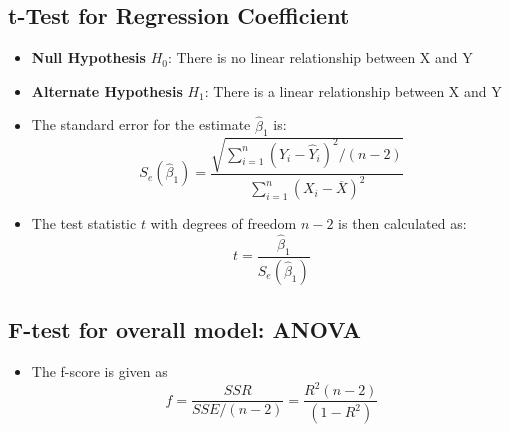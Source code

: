 \documentclass{article}
\theoremstyle{plain}
\theoremstyle{definition}
\begin{document}
\subsection{t-Test for Regression Coefficient}
\begin{itemize}
    \item \textbf{Null Hypothesis} $H_0$: There is no linear relationship between X and Y
    
    \item \textbf{Alternate Hypothesis} $H_1$: There is a linear relationship between X and Y
    
    \item The standard error for the estimate $\hat{\beta}_1$ is:
    \begin{equation*}
        S_e(\hat{\beta}_1) = \frac{\sqrt{\sum\limits_{i=1}^n (Y_i - \hat{Y}_i)^2 / (n-2)}}{\sum\limits_{i=1}^n (X_i - \overline{X})^2}
    \end{equation*}
    
    \item The test statistic $t$ with degrees of freedom $n-2$ is then calculated as:
    \begin{equation*}
        t = \frac{\hat{\beta}_1}{S_e(\hat{\beta}_1)}
    \end{equation*}
\end{itemize}

\subsection{F-test for overall model: ANOVA}
\begin{itemize}
    \item The f-score is given as
    \begin{equation*}
        f = \frac{SSR}{SSE/(n-2)} = \frac{R^2 (n-2)}{(1-R^2)}
    \end{equation*}
\end{itemize}
\end{document}
